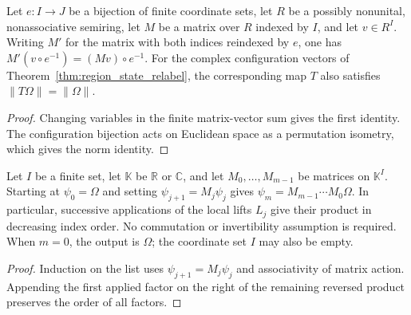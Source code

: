 \begin{theorem}
    \label{thm:coordinate_matrix_action}
    \leanok
    Let $e:I\to J$ be a bijection of finite coordinate sets, let $R$ be
    a possibly nonunital, nonassociative semiring, let $M$ be a matrix
    over $R$ indexed by $I$, and let $v\in R^I$. Writing $M'$ for the
    matrix with both indices reindexed by $e$, one has
    $M'(v\circ e^{-1})=(Mv)\circ e^{-1}$.
    For the complex configuration vectors of
    Theorem~\ref{thm:region_state_relabel}, the corresponding map $T$
    also satisfies $\|T\Omega\|=\|\Omega\|$.
\end{theorem}
\begin{proof}
    \leanok
    Changing variables in the finite matrix-vector sum gives the first
    identity. The configuration bijection acts on Euclidean space as
    a permutation isometry, which gives the norm identity.
\end{proof}

\begin{theorem}
    \label{thm:ordered_matrix_action}
    \leanok
    Let $I$ be a finite set, let $\mathbb K$ be $\mathbb R$ or $\mathbb C$,
    and let $M_0,\ldots,M_{m-1}$ be matrices on $\mathbb K^I$.
    Starting at $\psi_0=\Omega$ and setting $\psi_{j+1}=M_j\psi_j$ gives
    $\psi_m=M_{m-1}\cdots M_0\Omega$. In particular, successive applications
    of the local lifts $L_j$ give their product in decreasing index order.
    No commutation or invertibility assumption is required. When $m=0$,
    the output is $\Omega$; the coordinate set $I$ may also be empty.
\end{theorem}
\begin{proof}
    \leanok
    Induction on the list uses $\psi_{j+1}=M_j\psi_j$ and associativity of
    matrix action. Appending the first applied factor on the right of
    the remaining reversed product preserves the order of all factors.
\end{proof}

